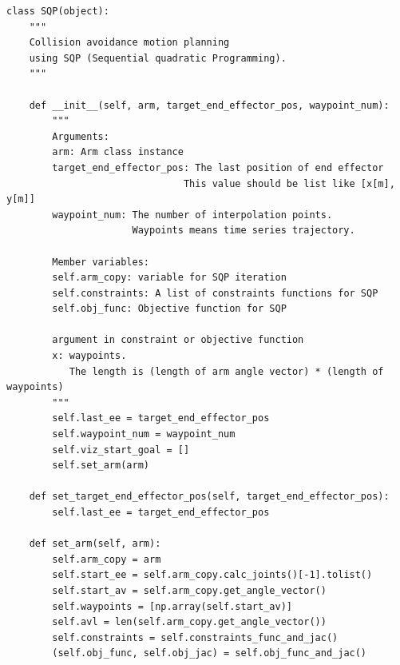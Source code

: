 \begin{verbatim}
class SQP(object):
    """
    Collision avoidance motion planning
    using SQP (Sequential quadratic Programming).
    """

    def __init__(self, arm, target_end_effector_pos, waypoint_num):
        """
        Arguments:
        arm: Arm class instance
        target_end_effector_pos: The last position of end effector
                               This value should be list like [x[m], y[m]]
        waypoint_num: The number of interpolation points.
                      Waypoints means time series trajectory.

        Member variables:
        self.arm_copy: variable for SQP iteration
        self.constraints: A list of constraints functions for SQP
        self.obj_func: Objective function for SQP

        argument in constraint or objective function
        x: waypoints.
           The length is (length of arm angle vector) * (length of waypoints)
        """
        self.last_ee = target_end_effector_pos
        self.waypoint_num = waypoint_num
        self.viz_start_goal = []
        self.set_arm(arm)

    def set_target_end_effector_pos(self, target_end_effector_pos):
        self.last_ee = target_end_effector_pos

    def set_arm(self, arm):
        self.arm_copy = arm
        self.start_ee = self.arm_copy.calc_joints()[-1].tolist()
        self.start_av = self.arm_copy.get_angle_vector()
        self.waypoints = [np.array(self.start_av)]
        self.avl = len(self.arm_copy.get_angle_vector())
        self.constraints = self.constraints_func_and_jac()
        (self.obj_func, self.obj_jac) = self.obj_func_and_jac()


\end{verbatim}
